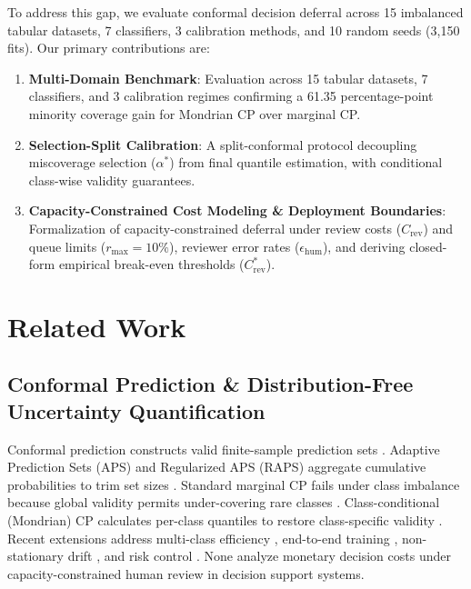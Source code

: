\documentclass{ieeetj}
\begin{document}
To address this gap, we evaluate conformal decision deferral across 15 imbalanced tabular datasets, 7 classifiers, 3 calibration methods, and 10 random seeds (3,150 fits). Our primary contributions are:
\begin{enumerate}
    \item \textbf{Multi-Domain Benchmark}: Evaluation across 15 tabular datasets, 7 classifiers, and 3 calibration regimes confirming a 61.35 percentage-point minority coverage gain for Mondrian CP over marginal CP.
    \item \textbf{Selection-Split Calibration}: A split-conformal protocol decoupling miscoverage selection ($\alpha^*$) from final quantile estimation, with conditional class-wise validity guarantees.
    \item \textbf{Capacity-Constrained Cost Modeling \& Deployment Boundaries}: Formalization of capacity-constrained deferral under review costs ($C_{\mathrm{rev}}$) and queue limits ($r_{\max} = 10\%$), reviewer error rates ($\epsilon_{\mathrm{hum}}$), and deriving closed-form empirical break-even thresholds ($C_{\mathrm{rev}}^*$).
\end{enumerate}

\section{Related Work}
\label{sec:related_work}

\subsection{Conformal Prediction \& Distribution-Free Uncertainty Quantification}
Conformal prediction constructs valid finite-sample prediction sets \cite{vovk2005algorithmic, angelopoulos2021gentle, papadopoulos2002inductive}. Adaptive Prediction Sets (APS) and Regularized APS (RAPS) aggregate cumulative probabilities to trim set sizes \cite{romano2020classification, angelopoulos2021uncertainty, huang2024saps}. Standard marginal CP fails under class imbalance because global validity permits under-covering rare classes \cite{lei2018distribution}. Class-conditional (Mondrian) CP calculates per-class quantiles to restore class-specific validity \cite{vovk2005algorithmic, sadinle2019least, vovk2012conditional, lofstrom2015bias, norinder2017applying, toccaceli2019combination, bostrom2021mondrian}. Recent extensions address multi-class efficiency \cite{ding2023class, shi2024rc3p}, end-to-end training \cite{stutz2022learning}, non-stationary drift \cite{gibbs2021adaptive}, and risk control \cite{angelopoulos2024risk, bartlett2008classification}. None analyze monetary decision costs under capacity-constrained human review in decision support systems.
\end{document}
